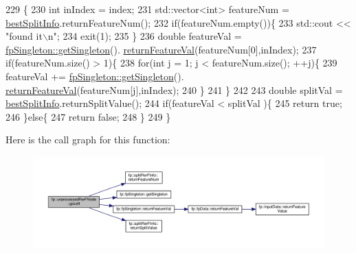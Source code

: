 \begin{DoxyCode}
229                                                     \{
230                     \textcolor{keywordtype}{int} inIndex = index;
231                     std::vector<int> featureNum = \hyperlink{classfp_1_1unprocessedRerFNode_acf98051b30cb1c0f2e62bb7df51c0884}{bestSplitInfo}.returnFeatureNum();
232                     \textcolor{keywordflow}{if}(featureNum.empty())\{
233                         std::cout << \textcolor{stringliteral}{"found it\(\backslash\)n"};
234                         exit(1);
235                     \}
236                     \textcolor{keywordtype}{double} featureVal = \hyperlink{classfp_1_1fpSingleton_a8bdae77b68521003e3fc630edec2e240}{fpSingleton::getSingleton}().
      \hyperlink{classfp_1_1fpSingleton_aacc2eb894a219e2fe234743b51fa1a76}{returnFeatureVal}(featureNum[0],inIndex);
237                     \textcolor{keywordflow}{if}(featureNum.size() > 1)\{
238                         \textcolor{keywordflow}{for}(\textcolor{keywordtype}{int} j = 1; j < featureNum.size(); ++j)\{
239 featureVal += \hyperlink{classfp_1_1fpSingleton_a8bdae77b68521003e3fc630edec2e240}{fpSingleton::getSingleton}().
      \hyperlink{classfp_1_1fpSingleton_aacc2eb894a219e2fe234743b51fa1a76}{returnFeatureVal}(featureNum[j],inIndex);
240                         \}
241                     \}
242 
243                     \textcolor{keywordtype}{double} splitVal = \hyperlink{classfp_1_1unprocessedRerFNode_acf98051b30cb1c0f2e62bb7df51c0884}{bestSplitInfo}.returnSplitValue();
244                     \textcolor{keywordflow}{if}(featureVal < splitVal )\{
245                         \textcolor{keywordflow}{return} \textcolor{keyword}{true};
246                     \}\textcolor{keywordflow}{else}\{
247                         \textcolor{keywordflow}{return} \textcolor{keyword}{false};
248                     \}
249                 \}
\end{DoxyCode}
Here is the call graph for this function\+:
\nopagebreak
\begin{figure}[H]
\begin{center}
\leavevmode
\includegraphics[width=350pt]{classfp_1_1unprocessedRerFNode_a4c4e6bb795c327b38301610d0158735a_cgraph}
\end{center}
\end{figure}
\mbox{\label{classfp_1_1unprocessedRerFNode_a6510faa628fda49d672dcd1b88a3834b}} 
